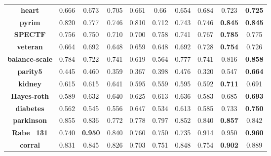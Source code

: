\documentclass[a4paper,12pt]{article}
\begin{document}
\begin{table*}[htb]
\begin{tabular}{cccccccccc}
\textbf{heart}         & 0.666        & 0.673          & 0.705        & 0.661        & 0.66               & 0.654          & 0.684          & 0.723            & \textbf{0.725} \\
\textbf{pyrim}            & 0.820        & 0.777          & 0.746        & 0.810        & 0.712              & 0.743          & 0.746          & \textbf{0.845}   & \textbf{0.845} \\
\textbf{SPECTF}           & 0.756        & 0.750          & 0.710        & 0.700        & 0.758              & 0.741          & 0.767          & \textbf{0.785}   & 0.775          \\
\textbf{veteran}          & 0.664        & 0.692          & 0.648        & 0.659        & 0.648              & 0.692          & 0.728          & \textbf{0.754}   & 0.726          \\
\textbf{balance-scale}    & 0.784        & 0.722          & 0.741        & 0.619        & 0.564              & 0.777          & 0.741          & 0.816            & \textbf{0.858} \\
\textbf{parity5}          & 0.445        & 0.460          & 0.359        & 0.367        & 0.398              & 0.476          & 0.320          & 0.547            & \textbf{0.664} \\
\textbf{kidney}           & 0.615        & 0.615          & 0.641        & 0.595        & 0.559              & 0.595          & 0.592          & \textbf{0.711}   & 0.691          \\
\textbf{Hayes-roth}       & 0.589        & 0.632          & 0.640        & 0.625        & 0.613              & 0.636          & 0.583          & 0.685            & \textbf{0.693} \\
\textbf{diabetes} & 0.562        & 0.545          & 0.556        & 0.647        & 0.534              & 0.613          & 0.585          & 0.733            & \textbf{0.750} \\
\textbf{parkinson}       & 0.855        & 0.836          & 0.772        & 0.778        & 0.797              & 0.852          & 0.840          & \textbf{0.857}   & 0.842          \\
\textbf{Rabe\_131}        & 0.740        & \textbf{0.950} & 0.840        & 0.760        & 0.750              & 0.735          & 0.914          & 0.950            & \textbf{0.960} \\
\textbf{corral}           & 0.831        & 0.845          & 0.826        & 0.703        & 0.751              & 0.848          & 0.754          & \textbf{0.902}   & 0.889          \\

\end{tabular}
\end{table*}
\end{document}
